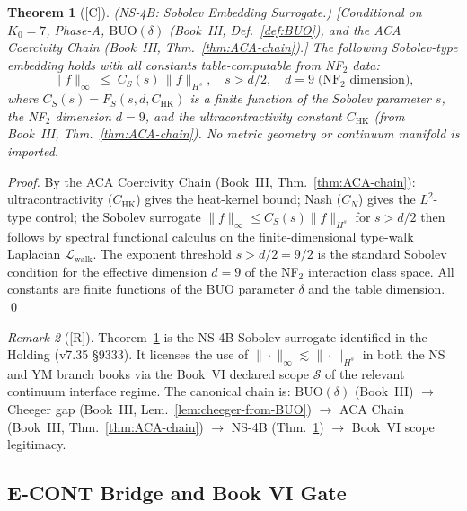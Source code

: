 \documentclass[12pt,oneside]{amsbook}
\theoremstyle{plain}
\newtheorem{theorem}{Theorem}[section]
\theoremstyle{definition}
\theoremstyle{remark}
\newtheorem{remark}[theorem]{Remark}
\newcommand{\status}[1]{\textup{[#1]}}
\begin{document}
\begin{theorem}[\status{C}]\label{thm:NS-4B-sobolev}
\textup{(NS-4B: Sobolev Embedding Surrogate.)}
\textup{[Conditional on $K_0=7$, Phase-A, $\mathrm{BUO}(\delta)$
(Book~III, Def.~\ref{def:BUO}), and the ACA Coercivity Chain
(Book~III, Thm.~\ref{thm:ACA-chain}).]}
The following Sobolev-type embedding holds with all constants
table-computable from NF$_2$ data:
\[
  \|f\|_\infty \;\leq\; C_S(s)\,\|f\|_{H^s},
  \quad s > d/2,\quad d = 9\;\text{(NF$_2$ dimension)},
\]
where $C_S(s) = F_S(s, d, C_{\mathrm{HK}})$ is a finite function
of the Sobolev parameter $s$, the NF$_2$ dimension $d=9$, and
the ultracontractivity constant $C_{\mathrm{HK}}$ (from
Book~III, Thm.~\ref{thm:ACA-chain}).  No metric geometry or
continuum manifold is imported.
\end{theorem}

\begin{proof}
By the ACA Coercivity Chain (Book~III, Thm.~\ref{thm:ACA-chain}):
ultracontractivity ($C_{\mathrm{HK}}$) gives the heat-kernel
bound; Nash ($C_N$) gives the $L^2$-type control; the Sobolev
surrogate $\|f\|_\infty \leq C_S(s)\|f\|_{H^s}$ for $s > d/2$
then follows by spectral functional calculus on the finite-dimensional
type-walk Laplacian $\mathcal{L}_{\mathrm{walk}}$.  The exponent
threshold $s > d/2 = 9/2$ is the standard Sobolev condition for
the effective dimension $d=9$ of the NF$_2$ interaction class space.
All constants are finite functions of the BUO parameter $\delta$
and the table dimension. \qed
\end{proof}

\begin{remark}[\status{R}]
Theorem~\ref{thm:NS-4B-sobolev} is the NS-4B Sobolev surrogate
identified in the Holding (v7.35 §9333).  It licenses the use of
$\|\cdot\|_\infty \lesssim \|\cdot\|_{H^s}$ in both the NS and YM
branch books via the Book~VI declared scope $\mathcal{S}$ of the
relevant continuum interface regime.  The canonical chain is:
$\mathrm{BUO}(\delta)$ (Book~III) $\to$ Cheeger gap
(Book~III, Lem.~\ref{lem:cheeger-from-BUO}) $\to$ ACA Chain
(Book~III, Thm.~\ref{thm:ACA-chain}) $\to$ NS-4B
(Thm.~\ref{thm:NS-4B-sobolev}) $\to$ Book~VI scope legitimacy.
\end{remark}

\subsection{E-CONT Bridge and Book VI Gate}
\end{document}
